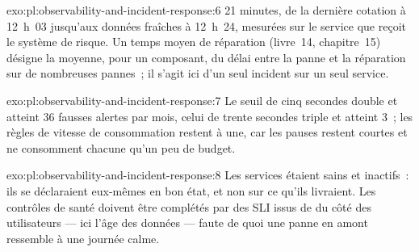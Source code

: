 \begin{solution}{exo:pl:observability-and-incident-response:6}
21 minutes, de la dernière cotation à 12~h~03 jusqu'aux données fraîches à 12~h~24, mesurées sur le service que reçoit le système de risque. Un temps moyen de
réparation (livre~14, chapitre~15) désigne la moyenne, pour un composant, du délai entre la panne et la réparation sur de nombreuses pannes~; il s'agit ici d'un seul incident sur un seul service.
\end{solution}

\begin{solution}{exo:pl:observability-and-incident-response:7}
Le seuil de cinq secondes double et atteint 36 fausses alertes par mois, celui de trente secondes triple et atteint 3~; les règles de vitesse de consommation restent à une, car les
pauses restent courtes et ne consomment chacune qu'un peu de budget.
\end{solution}

\begin{solution}{exo:pl:observability-and-incident-response:8}
Les services étaient sains et inactifs~: ils se déclaraient eux-mêmes en bon état, et non sur ce qu'ils livraient. Les contrôles de santé doivent être complétés par des SLI issus de
du côté des utilisateurs --- ici l'âge des données --- faute de quoi une panne en amont ressemble à une journée calme.
\end{solution}

